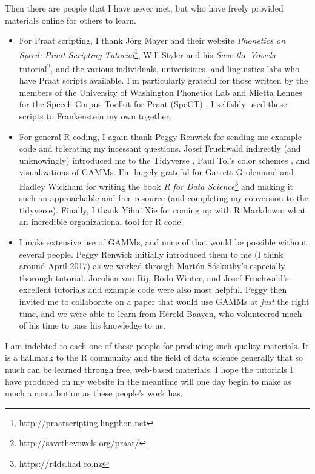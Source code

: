 Then there are people that I have never met, but who have freely provided materials online for others to learn.
\begin{itemize}
    \item For Praat scripting, I thank J\"org Mayer and their website \textit{Phonetics on Speed: Praat Scripting Tutorial}\footnote{http://praat\-scripting.ling\-phon.net}, Will Styler and his \textit{Save the Vowels} tutorial\footnote{http://save\-the\-vowels.org/praat/}, and the various individuals, univerisities, and linguistics labs who have Praat scripts available. I'm particularly grateful for those written by the members of the University of Washington Phonetics Lab and Mietta Lennes for the Speech Corpus Toolkit for Praat (SpeCT) \citep{lennes_2017}. I selfishly used these scripts to Frankenstein my own together.
    \item For general R coding, I again thank Peggy Renwick for sending me example code and tolerating my incessant questions. Josef Fruehwald indirectly (and unknowingly) introduced me to the Tidyverse \citep{wickham_2017_tidyverse}, Paul Tol's color schemes \citep{tol_2012}, and visualizations of GAMMs. I'm hugely grateful for Garrett Grolemund and Hadley Wickham for writing the book \textit{R for Data Science}\footnote{https://r4ds.had.co.nz} and making it such an approachable and free resource (and completing my conversion to the tidyverse). Finally, I thank Yihui Xie for coming up with R Markdown: what an incredible organizational tool for R code!
    \item I make extensive use of GAMMs, and none of that would be possible without several people. Peggy Renwick initially introduced them to me (I think around April 2017) as we worked through Mart\'on S\'oskuthy's \citeyearpar{soskuthy_2017} especially thorough tutorial. Jocolien van Rij, Bodo Winter, and Josef Fruehwald's excellent tutorials and example code were also most helpful. Peggy then invited me to collaborate on a paper that would use GAMMs at \textit{just} the right time, and we were able to learn from Herold Baayen, who volunteered much of his time to pass his knowledge to us.
\end{itemize}
I am indebted to each one of these people for producing such quality materials. It is a hallmark to the R community and the field of data science generally that so much can be learned through free, web-based materials. I hope the tutorials I have produced on my website in the meantime will one day begin to make as much a contribution as these people's work has.

